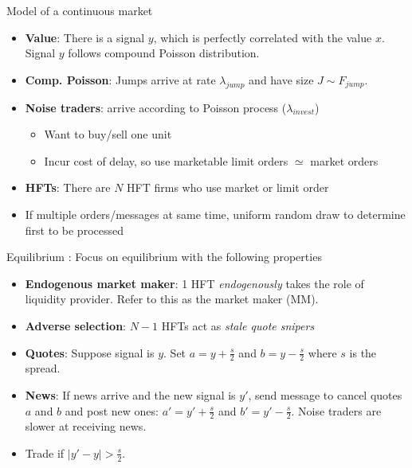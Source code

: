 \documentclass[english,10pt
,aspectratio=169
]{beamer}
\begin{document}
\begin{frame}{Model of a continuous market}
	\begin{itemize}
		\item \textbf{Value}: There is a signal $y$, which is perfectly correlated with the value $x$. Signal $y$ follows compound Poisson distribution.
		\item \textbf{Comp. Poisson}: Jumps arrive at rate $\lambda_{jump}$ and have size $J \sim F_{jump}$.
	\end{itemize}
	\begin{itemize}
		\item \textbf{Noise traders}: arrive according to Poisson process ($\lambda_{invest}$)
		\begin{itemize}
			\item Want to buy/sell one unit
			\item Incur cost of delay, so use marketable limit orders $\simeq$ market orders
		\end{itemize}
		\item \textbf{HFTs}: There are $N$ HFT firms who use market or limit order
	\end{itemize}
	\begin{itemize}
		\item If multiple orders/messages at same time, uniform random draw to determine first to be processed
	\end{itemize}
\end{frame}


\begin{frame}{Equilibrium}
	: Focus on equilibrium with the following properties
	\begin{itemize}
		\item \textbf{Endogenous market maker}: 1 HFT \textit{endogenously} takes the role of liquidity provider. Refer to this as the market maker (MM).
		\item \textbf{Adverse selection}: $N-1$ HFTs act as \textit{stale quote snipers}
	\end{itemize}
	\begin{itemize}
		\item \textbf{Quotes}: Suppose signal is  $y$. Set $a=y+\frac{s}{2}$ and $b=y-\frac{s}{2}$ where $s$ is the spread.
		\item \textbf{News}: If news arrive and the new signal is $y'$, send message to cancel quotes $a$ and $b$ and post new ones: $a'=y'+\frac{s}{2}$ and $b'=y'-\frac{s}{2}$. Noise traders are slower at receiving news.
	\end{itemize}
	\begin{itemize}
		\item Trade if $|y'-y|>\frac{s}{2}$.
	\end{itemize}
\end{frame}
\end{document}
